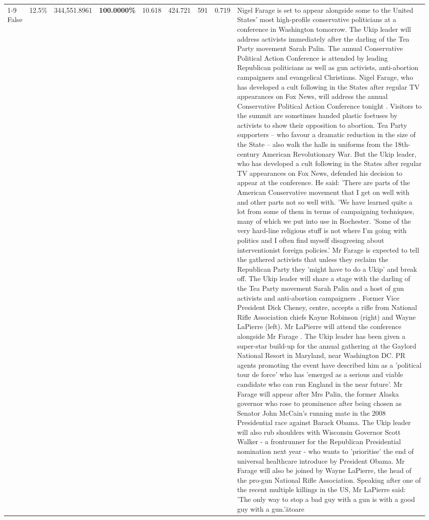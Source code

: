 \begin{table}[H]
\begin{tabular}{lllrlllll}
\cline{1-9}
False & 12.5\% & 344,551.8961 & \bfseries \color{red} 100.0000\% & 10.618 & 424.721 & 591 & 0.719 & Nigel Farage is set to appear alongside some to the United States' most high-profile conservative politicians at a conference in Washington tomorrow. The Ukip leader will address activists immediately after the darling of the Tea Party movement Sarah Palin. The annual Conservative Political Action Conference is attended by leading Republican politicians as well as gun activists, anti-abortion campaigners and evangelical Christians. Nigel Farage, who has developed a cult following in the States after regular TV appearances on Fox News, will address the annual Conservative Political Action Conference tonight . Visitors to the summit are sometimes handed plastic foetuses by activists to show their opposition to abortion. Tea Party supporters – who favour a dramatic reduction in the size of the State – also walk the halls in uniforms from the 18th-century American Revolutionary War. But the Ukip leader, who has developed a cult following in the States after regular TV appearances on Fox News, defended his decision to appear at the conference. He said: 'There are parts of the American Conservative movement that I get on well with and other parts not so well with. 'We have learned quite a lot from some of them in terms of campaigning techniques, many of which we put into use in Rochester. 'Some of the very hard-line religious stuff is not where I'm going with politics and I often find myself disagreeing about interventionist foreign policies.' Mr Farage is expected to tell the gathered activists that unless they reclaim the Republican Party they 'might have to do a Ukip' and break off. The Ukip leader will share a stage with the darling of the Tea Party movement Sarah Palin and a host of gun activists and anti-abortion campaigners . Former Vice President Dick Cheney, centre, accepts a rifle from National Rifle Association chiefs Kayne Robinson (right) and Wayne LaPierre (left). Mr LaPierre will attend the conference alongside Mr Farage . The Ukip leader has been given a super-star build-up for the annual gathering at the Gaylord National Resort in Maryland, near Washington DC. PR agents promoting the event have described him as a 'political tour de force' who has 'emerged as a serious and viable candidate who can run England in the near future'. Mr Farage will appear after Mrs Palin, the former Alaska governor who rose to prominence after being chosen as Senator John McCain's running mate in the 2008 Presidential race against Barack Obama. The Ukip leader will also rub shoulders with Wisconsin Governor Scott Walker - a frontrunner for the Republican Presidential nomination next year - who wants to 'prioritise' the end of universal healthcare introduce by President Obama. Mr Farage will also be joined by Wayne LaPierre, the head of the pro-gun National Rifle Association. Speaking after one of the recent multiple killings in the US, Mr LaPierre said: 'The only way to stop a bad guy with a gun is with a good guy with a gun.'ătoare \\

\end{tabular}
\end{table}
